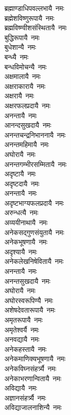 \begin{flushleft}
\begin{multicols}{2}
ब्रह्माण्डाधिपवल्लभायै~नमः\\
ब्रह्मेशविष्णुरूपायै~नमः\\
ब्रह्मविष्ण्वीशसंस्थितायै~नमः\\
बुद्धिरूपायै~नमः\\
बुधेशान्यै~नमः\\
बन्ध्यै~नमः\hfill{}\\
बन्धविमोचन्यै~नमः\\
अक्षमालायै~नमः\\
अक्षराकारायै~नमः\\
अक्षरायै~नमः\\
अक्षरफलप्रदायै~नमः\\
अनन्तायै~नमः\\
आनन्दसुखदायै~नमः\\
अनन्तचन्द्रनिभाननायै~नमः\\
अनन्तमहिमायै~नमः\\
अघोरायै~नमः\hfill{}\\
अनन्तगम्भीरसम्मितायै~नमः\\
अदृष्टायै~नमः\\
अदृष्टदायै~नमः\\
अनन्तायै~नमः\\
अदृष्टभाग्यफलप्रदायै~नमः\\
अरुन्धत्यै~नमः\\
अव्ययीनाथायै~नमः\\
अनेकसद्गुणसंयुतायै~नमः\\
अनेकभूषणायै~नमः\\
अदृश्यायै~नमः\hfill{}\\
अनेकलेखनिषेवितायै~नमः\\
अनन्तायै~नमः\\
अनन्तसुखदायै~नमः\\
अघोरायै~नमः\\
अघोरस्वरूपिण्यै~नमः\\
अशेषदेवतारूपायै~नमः\\
अमृतरूपायै~नमः\\
अमृतेश्वर्यै~नमः\\
अनवद्यायै~नमः\\
अनेकहस्तायै~नमः\hfill{}\\
अनेकमाणिक्यभूषणायै~नमः\\
अनेकविघ्नसंहर्त्र्यै~नमः\\
अनेकाभरणान्वितायै~नमः\\
अविद्यायै~नमः\\
अज्ञानसंहर्त्र्यै~नमः\\
अविद्याजालनाशिन्यै~नमः\\

\end{multicols}
\end{flushleft}
